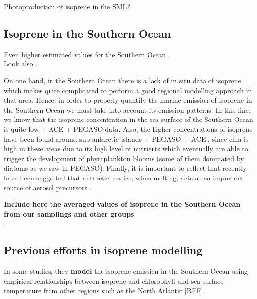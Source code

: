 \documentclass[draft,linenumbers]{agujournal}
\begin{document}
Photoproduction of isoprene in the SML? \citep{ciuraru2015photosensitized,mungall2017microlayer}

\subsection{Isoprene in the Southern Ocean} 

Even higher estimated values for the Southern Ocean \citep{meskhidze2006phytoplankton}.\\ Look also \citep{kameyama2014high}.

On one hand, in the Southern Ocean there is a lack of in situ data of isoprene \citep{hackenberg2017potential} which makes quite complicated to perform a good regional modelling approach in that area. Hence, in order to properly quantify the marine emission of isoprene in the Southern Ocean we must take into account its emission patterns. In this line, we know that the isoprene concentration in the sea surface of the Southern Ocean is quite low \citep{ooki2015global} + ACE + PEGASO data. Also, the higher concentrations of isoprene have been found around sub-antarctic islands \citep{meskhidze2015quantifying} + PEGASO + ACE , since chla is high in these areas due to its high level of nutrients which eventually are able to trigger the development of phytoplankton blooms (some of them dominated by diatoms as we saw in PEGASO). Finally, it is important to reflect that recently have been suggested that antarctic sea ice, when melting, acts as an important source of aerosol precursors \citep{dall2017antarctic}.

\textbf{Include here the averaged values of isoprene in the Southern Ocean from our samplings and other groups}\\
 \citep{kameyama2014high,ooki2016concentration,meskhidze2015quantifying,meskhidze2006phytoplankton}.
 
\subsection{Previous efforts in isoprene modelling}

In some studies, they \textbf{model} the isoprene emission in the Southern Ocean using empirical relationships between isoprene and chlorophyll and sea surface temperature from other regions such as the North Atlantic [REF].
\end{document}
